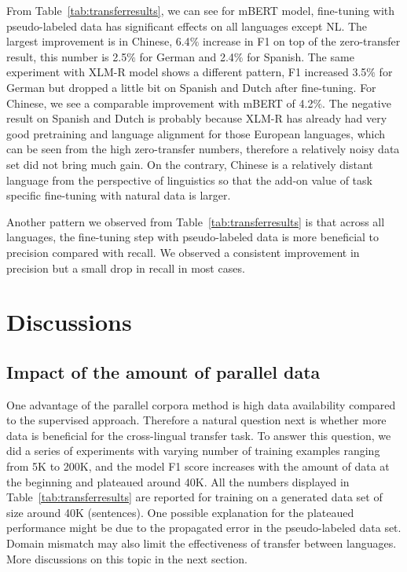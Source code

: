 \documentclass[11pt]{article}
\begin{document}
From Table~\ref{tab:transferresults}, we can see for mBERT model, fine-tuning with pseudo-labeled data has significant effects on all languages except NL. The largest improvement is in Chinese, 6.4$\%$ increase in F1 on top of the zero-transfer result, this number is 2.5$\%$ for German and 2.4$\%$ for Spanish. The same experiment with XLM-R model shows a different pattern, F1 increased 3.5$\%$ for German but dropped a little bit on Spanish and Dutch after fine-tuning. For Chinese, we see a comparable improvement with mBERT of 4.2$\%$. The negative result on Spanish and Dutch is probably because XLM-R has already had very good pretraining and language alignment for those European languages, which can be seen from the high zero-transfer numbers, therefore a relatively noisy data set did not bring much gain. On the contrary, Chinese is a relatively distant language from the perspective of linguistics so that the add-on value of task specific fine-tuning with natural data is larger.

Another pattern we observed from Table~\ref{tab:transferresults} is that across all languages, the fine-tuning step with pseudo-labeled data is more beneficial to precision compared with recall. We observed a consistent improvement in precision but a small drop in recall in most cases.

\section{Discussions}
\label{section:further}

\subsection{Impact of the amount of parallel data}
One advantage of the parallel corpora method is high data availability compared to the supervised approach. Therefore a natural question next is whether more data is beneficial for the cross-lingual transfer task. To answer this question, we did a series of experiments with varying number of training examples ranging from 5K to 200K, and the model F1 score increases with the amount of data at the beginning and plateaued around 40K. All the numbers displayed in Table~\ref{tab:transferresults} are reported for training on a generated data set of size around 40K (sentences). One possible explanation for the plateaued performance might be due to the propagated error in the pseudo-labeled data set. Domain mismatch may also limit the effectiveness of transfer between languages. More discussions on this topic in the next section. 
\end{document}
